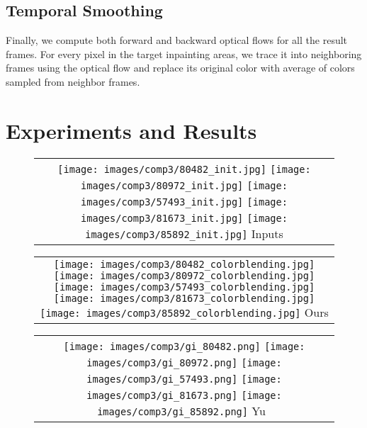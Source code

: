 \documentclass[runningheads]{llncs}
\begin{document}
\subsection{Temporal Smoothing}
Finally, we compute both forward and backward optical flows for all the result frames. For every pixel in the target inpainting areas, we trace it into neighboring frames using the optical flow and replace its original color with average of colors sampled from neighbor frames.  
\section{Experiments and Results}


\begin{figure}[b!]
\begin{tabular}{@{}c@{}}
    \centering
    \raisebox{-.5\height} {
    \texttt{[image: images/comp3/80482\_init.jpg]}\hspace{-0.06 cm}
    \texttt{[image: images/comp3/80972\_init.jpg]}\hspace{-0.06 cm}
    \texttt{[image: images/comp3/57493\_init.jpg]}\hspace{-0.06 cm}
    \texttt{[image: images/comp3/81673\_init.jpg]}\hspace{-0.06 cm}
    \texttt{[image: images/comp3/85892\_init.jpg]}
    } Inputs
\end{tabular}

\begin{tabular}{@{}c@{}}
    \centering
    \raisebox{-.5\height} {
    \texttt{[image: images/comp3/80482\_colorblending.jpg]}\hspace{-0.06 cm}
    \texttt{[image: images/comp3/80972\_colorblending.jpg]}\hspace{-0.06 cm}
    \texttt{[image: images/comp3/57493\_colorblending.jpg]}\hspace{-0.06 cm}
    \texttt{[image: images/comp3/81673\_colorblending.jpg]}\hspace{-0.06 cm}
    \texttt{[image: images/comp3/85892\_colorblending.jpg]}
    }  Ours 
\end{tabular}

\begin{tabular}{@{}c@{}}
    \centering
    \raisebox{-.5\height} {
    \texttt{[image: images/comp3/gi\_80482.png]}\hspace{-0.06 cm}
    \texttt{[image: images/comp3/gi\_80972.png]}\hspace{-0.06 cm}
    \texttt{[image: images/comp3/gi\_57493.png]}\hspace{-0.06 cm}
    \texttt{[image: images/comp3/gi\_81673.png]}\hspace{-0.06 cm}
    \texttt{[image: images/comp3/gi\_85892.png]}
    } Yu~\cite{yu2018generative}
\end{tabular}


\end{figure}
\end{document}
